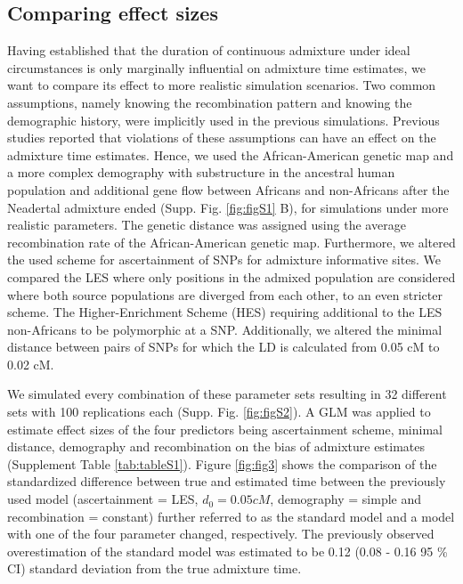 \documentclass[]{article}
\begin{document}
\subsection{Comparing effect sizes}\label{comparing effect sizes}

Having established that the duration of continuous admixture under ideal
circumstances is only marginally influential on admixture time
estimates, we want to compare its effect to more realistic simulation scenarios. Two common assumptions, namely knowing the recombination pattern and knowing the demographic history, were implicitly used in the previous simulations.
Previous studies reported that violations of these assumptions can have an effect on the admixture time estimates.
Hence, we used the African-American genetic map and a more complex demography with substructure in the ancestral human population and additional gene flow between Africans and non-Africans after the Neadertal admixture ended (Supp. Fig. \ref{fig:figS1} B), for simulations under more realistic parameters. The genetic distance was assigned using the average recombination rate of the African-American genetic map.
Furthermore, we altered the used scheme for ascertainment of SNPs for admixture informative sites. We compared the LES where only
positions in the admixed population are considered where both source
populations are diverged from each other, to an even stricter scheme. The Higher-Enrichment Scheme (HES) requiring additional
to the LES non-Africans to be polymorphic at a SNP. Additionally, we altered the minimal distance between pairs of SNPs for which the LD is calculated from 0.05 cM to 0.02 cM.



We simulated every combination of these parameter sets resulting in 32
different sets with 100 replications each (Supp. Fig. \ref{fig:figS2}).
A GLM was applied to estimate effect sizes of the four predictors being
ascertainment scheme, minimal distance, demography and recombination on
the bias of admixture estimates (Supplement Table \ref{tab:tableS1}).
Figure \ref{fig:fig3} shows the comparison of the standardized
difference between true and estimated time between the previously used
model (ascertainment = LES, \(d_{0} = 0.05 cM\), demography = simple and
recombination = constant) further referred to as the standard model and
a model with one of the four parameter changed, respectively. The
previously observed overestimation of the standard model was estimated
to be 0.12 (0.08 - 0.16 95 \% CI) standard deviation from the true
admixture time.
\end{document}
